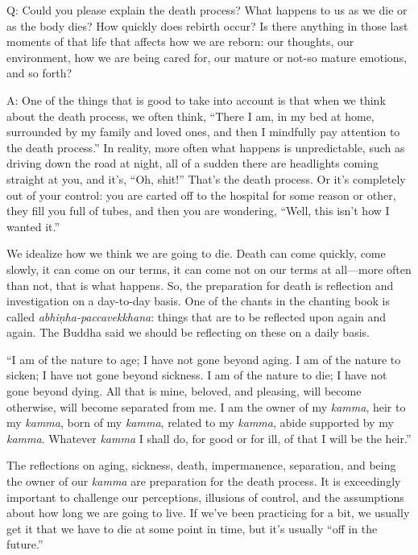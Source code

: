 \vspace{\the\qaskip}
Q: Could you please explain the death process? What happens to us as we
die or as the body dies? How quickly does rebirth occur? Is there
anything in those last moments of that life that affects how we are
reborn: our thoughts, our environment, how we are being cared for, our
mature or not-so mature emotions, and so forth?

\vspace{\the\qaskip}
A: One of the things that is good to take into account is that when we
think about the death process, we often think, “There I am, in my bed at
home, surrounded by my family and loved ones, and then I mindfully pay
attention to the death process.” In reality, more often what happens is
unpredictable, such as driving down the road at night, all of a sudden
there are headlights coming straight at you, and it’s, “Oh, shit!”
That’s the death process. Or it’s completely out of your control: you
are carted off to the hospital for some reason or other, they fill you
full of tubes, and then you are wondering, “Well, this isn’t how I
wanted it.”

We idealize how we think we are going to die. Death can come quickly,
come slowly, it can come on our terms, it can come not on our terms at
all—more often than not, that is what happens. So, the preparation for
death is reflection and investigation on a day-to-day basis. One of the
chants in the chanting book is called \emph{abhiṇha-paccavekkhana}:
things that are to be reflected upon again and again. The Buddha said we
should be reflecting on these on a daily basis.

“I am of the nature to age; I have not gone beyond aging. I am of the
nature to sicken; I have not gone beyond sickness. I am of the nature to
die; I have not gone beyond dying. All that is mine, beloved, and
pleasing, will become otherwise, will become separated from me. I am the
owner of my \emph{kamma}, heir to my \emph{kamma}, born of my
\emph{kamma}, related to my \emph{kamma}, abide supported by my
\emph{kamma}. Whatever \emph{kamma} I shall do, for good or for ill, of
that I will be the heir.”

The reflections on aging, sickness, death, impermanence, separation, and
being the owner of our \emph{kamma} are preparation for the death
process. It is exceedingly important to challenge our perceptions,
illusions of control, and the assumptions about how long we are going to
live. If we’ve been practicing for a bit, we usually get it that we have
to die at some point in time, but it’s usually “off in the future.”

